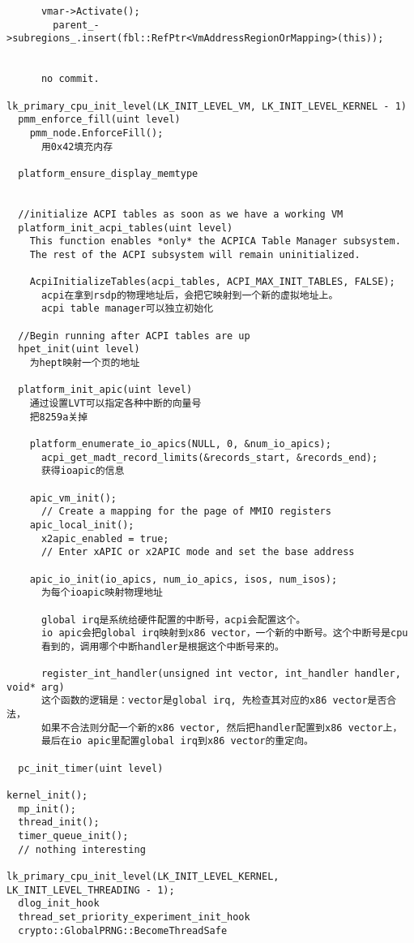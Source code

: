 \begin{verbatim}
      vmar->Activate();
        parent_->subregions_.insert(fbl::RefPtr<VmAddressRegionOrMapping>(this));
      
      
      no commit.

lk_primary_cpu_init_level(LK_INIT_LEVEL_VM, LK_INIT_LEVEL_KERNEL - 1)
  pmm_enforce_fill(uint level)
    pmm_node.EnforceFill();
      用0x42填充内存

  platform_ensure_display_memtype


  //initialize ACPI tables as soon as we have a working VM
  platform_init_acpi_tables(uint level)
    This function enables *only* the ACPICA Table Manager subsystem.
    The rest of the ACPI subsystem will remain uninitialized.

    AcpiInitializeTables(acpi_tables, ACPI_MAX_INIT_TABLES, FALSE);
      acpi在拿到rsdp的物理地址后，会把它映射到一个新的虚拟地址上。
      acpi table manager可以独立初始化
  
  //Begin running after ACPI tables are up
  hpet_init(uint level)
    为hept映射一个页的地址

  platform_init_apic(uint level)
    通过设置LVT可以指定各种中断的向量号
    把8259a关掉

    platform_enumerate_io_apics(NULL, 0, &num_io_apics);
      acpi_get_madt_record_limits(&records_start, &records_end);
      获得ioapic的信息

    apic_vm_init();
      // Create a mapping for the page of MMIO registers
    apic_local_init();
      x2apic_enabled = true;
      // Enter xAPIC or x2APIC mode and set the base address

    apic_io_init(io_apics, num_io_apics, isos, num_isos);
      为每个ioapic映射物理地址

      global irq是系统给硬件配置的中断号，acpi会配置这个。
      io apic会把global irq映射到x86 vector，一个新的中断号。这个中断号是cpu
      看到的，调用哪个中断handler是根据这个中断号来的。

      register_int_handler(unsigned int vector, int_handler handler, void* arg)
      这个函数的逻辑是：vector是global irq, 先检查其对应的x86 vector是否合法，
      如果不合法则分配一个新的x86 vector, 然后把handler配置到x86 vector上，
      最后在io apic里配置global irq到x86 vector的重定向。

  pc_init_timer(uint level)

kernel_init();
  mp_init();
  thread_init();
  timer_queue_init();
  // nothing interesting

lk_primary_cpu_init_level(LK_INIT_LEVEL_KERNEL, LK_INIT_LEVEL_THREADING - 1);
  dlog_init_hook
  thread_set_priority_experiment_init_hook
  crypto::GlobalPRNG::BecomeThreadSafe


\end{verbatim}
